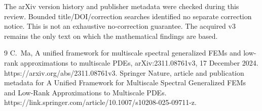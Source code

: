 \documentclass[10pt]{article}
\begin{document}
The arXiv version history and publisher metadata were checked during this review. Bounded title/DOI/correction searches identified no separate correction notice. This is not an exhaustive no-correction guarantee. The acquired v3 remains the only text on which the mathematical findings are based.\par
9 C. Ma, A unified framework for multiscale spectral generalized FEMs and low-rank approximations to multiscale PDEs, arXiv:2311.08761v3, 17 December 2024. https://arxiv.org/abs/2311.08761v3. Springer Nature, article and publication metadata for A Unified Framework for Multiscale Spectral Generalized FEMs and Low-Rank Approximations to Multiscale PDEs. https://link.springer.com/article/10.1007/s10208-025-09711-z.\par
\end{document}

